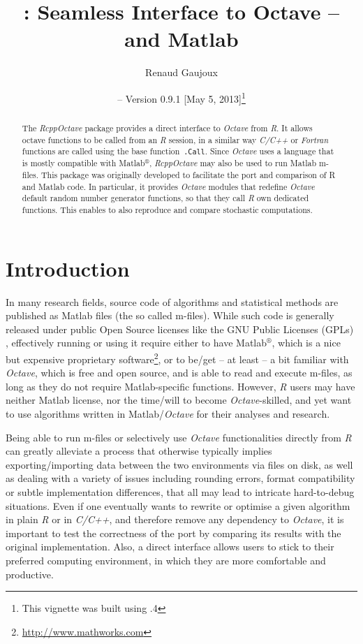 \documentclass[english,10pt,a4paper]{article}\usepackage{graphicx, color}
\author{Renaud Gaujoux}
\title{\pkgname{RcppOctave}: Seamless Interface to Octave -- and Matlab}
\date{\Rpkg{RcppOctave} -- Version 0.9.1
[May  5, 2013]\footnote{This vignette was built using \octave
3.6.4}}
\newcommand{\matlab}{Matlab$^\circledR$\xspace}
\let\proglang=\textit
\let\code=\texttt
\newcommand{\pkgname}[1]{\textit{#1}\xspace}
\newcommand{\Rpkg}[1]{\pkgname{#1} package\xspace}
\newcommand{\R}{\proglang{R}\xspace}
\newcommand{\octave}{\proglang{Octave}\xspace}
\begin{document}
\maketitle

\begin{abstract}
The \Rpkg{RcppOctave} provides a direct interface to \octave from
\R.
It allows \\octave functions to be called from an \R session,
in a similar way \proglang{C/C++} or \proglang{Fortran} functions are called using the base function~\code{.Call}.
Since \octave uses a language that is mostly compatible with \matlab,
\pkgname{RcppOctave} may also be used to run Matlab m-files.
This package was originally developed to facilitate the port and comparison of R
and Matlab code.
In particular, it provides \octave modules that redefine
\octave default random number generator functions, so that they call
\proglang{R} own dedicated functions.
This enables to also reproduce and compare stochastic computations.
\end{abstract}

\noindent\hrulefill
\tableofcontents
\noindent\hrulefill

\section{Introduction}

In many research fields, source code of algorithms and statistical methods are
published as Matlab files (the so called m-files).
While such code is generally released under public Open Source licenses like the
GNU Public Licenses (GPLs) \cite{gnuGPL}, effectively running or using it
require either to have \matlab, which is a nice but expensive proprietary
software\footnote{\url{http://www.mathworks.com}}, or to be/get -- at least -- a bit familiar with \octave \cite{Eaton2002}, which is free and open source, and is able to read and execute m-files, as long as they do not require Matlab-specific functions.
However, \proglang{R} users may have neither Matlab license, nor the
time/will to become \octave-skilled, and yet want to use algorithms written in
Matlab/\octave for their analyses and research.

Being able to run m-files or selectively use \octave functionalities
directly from \proglang{R} can greatly alleviate a process that otherwise
typically implies exporting/importing data between the two environments via
files on disk, as well as dealing with a variety of issues including
rounding errors, format compatibility or subtle implementation differences,
that all may lead to intricate hard-to-debug situations.
Even if one eventually wants to rewrite or optimise a given algorithm in plain
\proglang{R} or in \proglang{C/C++}, and therefore remove any dependency to
\octave, it is important to test the correctness of the port by
comparing its results with the original implementation.
Also, a direct interface allows users to stick to their preferred computing
environment, in which they are more comfortable and productive.
\end{document}
